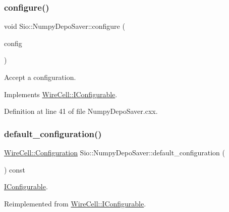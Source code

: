 \subsubsection{\texorpdfstring{configure()}{configure()}}
{\footnotesize\ttfamily void Sio\+::\+Numpy\+Depo\+Saver\+::configure (\begin{DoxyParamCaption}\item[{const \hyperlink{namespace_wire_cell_a9f705541fc1d46c608b3d32c182333ee}{Wire\+Cell\+::\+Configuration} \&}]{config }\end{DoxyParamCaption})\hspace{0.3cm}{\ttfamily [virtual]}}



Accept a configuration. 



Implements \hyperlink{class_wire_cell_1_1_i_configurable_a57ff687923a724093df3de59c6ff237d}{Wire\+Cell\+::\+I\+Configurable}.



Definition at line 41 of file Numpy\+Depo\+Saver.\+cxx.

\mbox{\label{class_wire_cell_1_1_sio_1_1_numpy_depo_saver_a84ddceb500e4627d7e9e4f8b030d5b7d}} 
\subsubsection{\texorpdfstring{default\+\_\+configuration()}{default\_configuration()}}
{\footnotesize\ttfamily \hyperlink{namespace_wire_cell_a9f705541fc1d46c608b3d32c182333ee}{Wire\+Cell\+::\+Configuration} Sio\+::\+Numpy\+Depo\+Saver\+::default\+\_\+configuration (\begin{DoxyParamCaption}{ }\end{DoxyParamCaption}) const\hspace{0.3cm}{\ttfamily [virtual]}}



\hyperlink{class_wire_cell_1_1_i_configurable}{I\+Configurable}. 



Reimplemented from \hyperlink{class_wire_cell_1_1_i_configurable_a54841b2da3d1ea02189478bff96f7998}{Wire\+Cell\+::\+I\+Configurable}.



